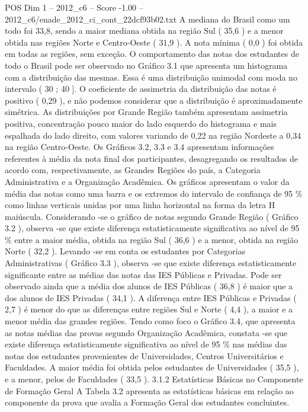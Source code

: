 \begin{textsample}{POS Dim 1 – 2012\_c6 – Score -1.00 – 2012\_c6/enade\_2012\_ci\_cont\_22dcf93b02.txt}
A mediana do Brasil como um todo foi 33,8, sendo a maior mediana obtida na região Sul ( 35,6 ) e a menor obtida nas regiões Norte e Centro-Oeste ( 31,9 ).
A nota mínima ( 0,0 ) foi obtida em todas as regiões, sem exceção.
O comportamento das notas dos estudantes de todo o Brasil pode ser observado no Gráfico 3.1 que apresenta um histograma com a distribuição das mesmas.
Essa é uma distribuição unimodal com moda no intervalo ( 30 ; 40 ].
O coeficiente de assimetria da distribuição das notas é positivo ( 0,29 ), e não podemos considerar que a distribuição é aproximadamente simétrica.
As distribuições por Grande Região também apresentam assimetria positiva, concentração pouco maior do lado esquerdo do histograma e mais espalhada do lado direito, com valores variando de 0,22 na região Nordeste a 0,34 na região Centro-Oeste.
Os Gráficos 3.2, 3.3 e 3.4 apresentam informações referentes à média da nota final dos participantes, desagregando os resultados de acordo com, respectivamente, as Grandes Regiões do país, a Categoria Administrativa e a Organização Acadêmica.
Os gráficos apresentam o valor da média das notas como uma barra e os extremos do intervalo de confiança de 95 \% como linhas verticais unidas por uma linha horizontal na forma da letra H maiúscula.
Considerando -se o gráfico de notas segundo Grande Região ( Gráfico 3.2 ), observa -se que existe diferença estatisticamente significativa ao nível de 95 \% entre a maior média, obtida na região Sul ( 36,6 ) e a menor, obtida na região Norte ( 32,2 ).
Levando -se em conta os estudantes por Categorias Administrativas ( Gráfico 3.3 ), observa -se que existe diferença estatisticamente significante entre as médias das notas das IES Públicas e Privadas.
Pode ser observado ainda que a média dos alunos de IES Públicas ( 36,8 ) é maior que a dos alunos de IES Privadas ( 34,1 ).
A diferença entre IES Públicas e Privadas ( 2,7 ) é menor do que as diferenças entre regiões Sul e Norte ( 4,4 ), a maior e a menor média das grandes regiões.
Tendo como foco o Gráfico 3.4, que apresenta as notas médias das provas segundo Organização Acadêmica, constata -se que existe diferença estatisticamente significativa ao nível de 95 \% nas médias das notas dos estudantes provenientes de Universidades, Centros Universitários e Faculdades.
A maior média foi obtida pelos estudantes de Universidades ( 35,5 ), e a menor, pelos de Faculdades ( 33,5 ). 3.1.2 Estatísticas Básicas no Componente de Formação Geral A Tabela 3.2 apresenta as estatísticas básicas em relação ao componente da prova que avalia a Formação Geral dos estudantes concluintes.

\end{textsample}
